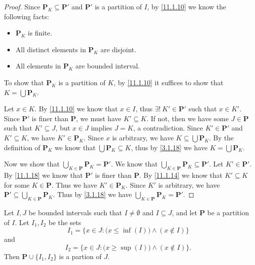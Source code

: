 \begin{proof}
  Since \(\mathbf{P}_K \subseteq \mathbf{P}'\) and \(\mathbf{P}'\) is a partition of \(I\), by \cref{11.1.10} we know the following facts:
  \begin{itemize}
    \item \(\mathbf{P}_K\) is finite.
    \item All distinct elements in \(\mathbf{P}_K\) are disjoint.
    \item All elements in \(\mathbf{P}_K\) are bounded interval.
  \end{itemize}
  To show that \(\mathbf{P}_K\) is a partition of \(K\), by \cref{11.1.10} it suffices to show that \(K = \bigcup \mathbf{P}_K\).

  Let \(x \in K\).
  By \cref{11.1.10} we know that \(x \in I\), thus \(\exists!\ K' \in \mathbf{P}'\) such that \(x \in K'\).
  Since \(\mathbf{P}'\) is finer than \(\mathbf{P}\), we must have \(K' \subseteq K\).
  If not, then we have some \(J \in \mathbf{P}\) such that \(K' \subseteq J\), but \(x \in J\) implies \(J = K\), a contradiction.
  Since \(K' \in \mathbf{P}'\) and \(K' \subseteq K\), we have \(K' \in \mathbf{P}_K\).
  Since \(x\) is arbitrary, we have \(K \subseteq \bigcup \mathbf{P}_K\).
  By the definition of \(\mathbf{P}_K\) we know that \(\bigcup \mathbf{P}_K \subseteq K\), thus by \cref{3.1.18} we have \(K = \bigcup \mathbf{P}_K\).

  Now we show that \(\bigcup_{K \in \mathbf{P}} \mathbf{P}_K = \mathbf{P}'\).
  We know that \(\bigcup_{K \in \mathbf{P}} \mathbf{P}_K \subseteq \mathbf{P}'\).
  Let \(K' \in \mathbf{P}'\).
  By \cref{11.1.18} we know that \(\mathbf{P}'\) is finer than \(\mathbf{P}\).
  By \cref{11.1.14} we know that \(K' \subseteq K\) for some \(K \in \mathbf{P}\).
  Thus we have \(K' \in \mathbf{P}_K\).
  Since \(K'\) is arbitrary, we have \(\mathbf{P}' \subseteq \bigcup_{K \in \mathbf{P}} \mathbf{P}_K\).
  Thus by \cref{3.1.18} we have \(\bigcup_{K \in \mathbf{P}} \mathbf{P}_K = \mathbf{P}'\).
\end{proof}

\begin{additional corollary}\label{ac 11.1.5}
Let \(I, J\) be bounded intervals such that \(I \neq \emptyset\) and \(I \subseteq J\), and let \(\mathbf{P}\) be a partition of \(I\).
Let \(I_1, I_2\) be the sets
\[
  I_1 = \Big\{x \in J : \big(x \leq \inf(I)\big) \land (x \notin I)\Big\}
\]
and
\[
  I_2 = \Big\{x \in J : \big(x \geq \sup(I)\big) \land (x \notin I)\Big\}.
\]
Then \(\mathbf{P} \cup \{I_1, I_2\}\) is a partion of \(J\).
\end{additional corollary}

